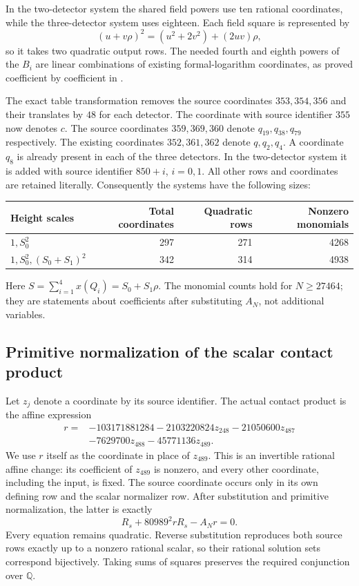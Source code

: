 \documentclass[11pt,a4paper]{article}
\theoremstyle{remark}\newtheorem{remark}[theorem]{Remark}
\newcommand{\Q}{\mathbb Q}\newcommand{\Z}{\mathbb Z}\newcommand{\HH}{\mathcal H}
\begin{document}
In the two-detector system the shared field powers use ten rational
coordinates, while the three-detector system uses eighteen. Each field
square is represented by
\[
 (u+v\rho)^2=(u^2+2v^2)+(2uv)\rho,
\]
so it takes two quadratic output rows. The needed fourth and eighth
powers of the $B_i$ are linear combinations of existing formal-logarithm
coordinates, as proved coefficient by coefficient in \cite{Packing}.

The exact table transformation removes the source coordinates
$353,354,356$ and their translates by $48$ for each detector. The
coordinate with source identifier $355$ now denotes $c$. The source
coordinates $359,369,360$ denote $q_{19},q_{38},q_{79}$ respectively.
The existing coordinates $352,361,362$ denote $q,q_2,q_4$. A coordinate
$q_8$ is already present in each of the three detectors. In the
two-detector system it is added with source identifier $850+i$,
$i=0,1$. All other rows and coordinates are retained literally.
Consequently the systems have the following sizes:
\begin{center}
\begin{tabular}{lrrr}
\toprule
Height scales&Total coordinates&Quadratic rows&Nonzero monomials\\\midrule
$1,S_0^2$&297&271&4268\\
$1,S_0^2,(S_0+S_1)^2$&342&314&4938\\\bottomrule
\end{tabular}
\end{center}
Here $S=\sum_{i=1}^4x(Q_i)=S_0+S_1\rho$. The monomial counts hold for
$N\ge27464$; they are statements about coefficients after substituting
$A_N$, not additional variables.


\subsection{Primitive normalization of the scalar contact product}
Let $z_j$ denote a coordinate by its source identifier. The actual
contact product is the affine expression
\[
 \begin{aligned}
 r={}&-103171881284-2103220824z_{248}-21050600z_{487}\\
     &-7629700z_{488}-45771136z_{489}.
 \end{aligned}
\]
We use $r$ itself as the coordinate in place of $z_{489}$. This is an
invertible rational affine change: its coefficient of $z_{489}$ is
nonzero, and every other coordinate, including the input, is fixed.
The source coordinate occurs only in its own defining row and the
scalar normalizer row. After substitution and primitive normalization,
the latter is exactly
\[
                  R_s+80989^2rR_s-A_Nr=0.
\]
Every equation remains quadratic. Reverse substitution reproduces both
source rows exactly up to a nonzero rational scalar, so their rational
solution sets correspond bijectively. Taking sums of squares preserves
the required conjunction over $\Q$.
\end{document}
